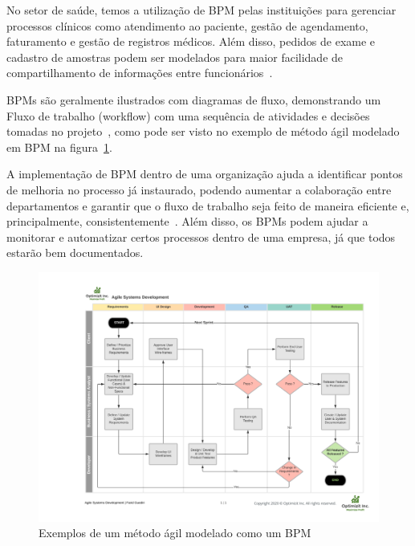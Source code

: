 No setor de saúde, temos a utilização de BPM pelas instituições para gerenciar processos clínicos como atendimento ao paciente, gestão de agendamento, faturamento e gestão de registros médicos. Além disso, pedidos de exame e cadastro de amostras podem ser modelados para maior facilidade de compartilhamento de informações entre funcionários~\cite{Ruiz2012BusinessHealthcare.}.


BPMs são geralmente ilustrados com diagramas de fluxo, demonstrando um Fluxo de trabalho (workflow) com uma sequência de atividades e decisões tomadas no projeto~\cite{Entringer2021ComparativeStudy}, como pode ser visto no exemplo de método ágil modelado em BPM na figura~\ref{fig:bpm}.

A implementação de BPM dentro de uma organização ajuda a identificar pontos de melhoria no processo já instaurado, podendo aumentar a colaboração entre departamentos e garantir que o fluxo de trabalho seja feito de maneira eficiente e, principalmente, consistentemente~\cite{DaSilva2014BusinessNot}.
Além disso, os BPMs podem ajudar a monitorar e automatizar certos processos dentro de uma empresa, já que todos estarão bem documentados.

\begin{figure}
    \centering
    \includegraphics[width=1\textwidth]{imgs/BPM/sprint as bpm.png}
    \caption{Exemplos de um método ágil modelado como um BPM}
    \label{fig:bpm}
\end{figure}


